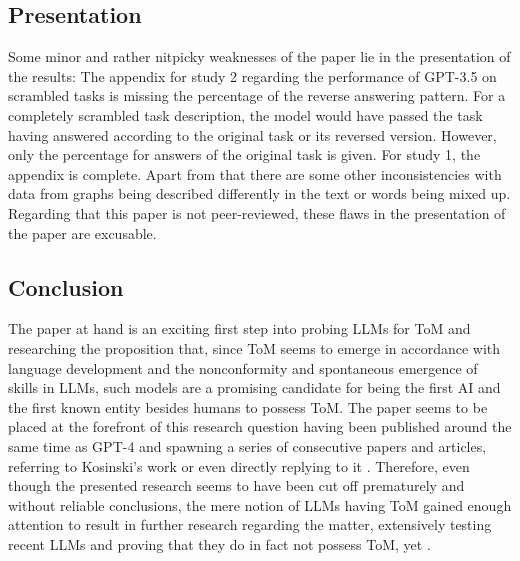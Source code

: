 \subsection{Presentation}
Some minor and rather nitpicky weaknesses of the paper lie in the presentation of the results: The appendix for study 2 regarding the performance of GPT-3.5 on scrambled tasks is missing the percentage of the reverse answering pattern. For a completely scrambled task description, the model would have passed the task having answered according to the original task or its reversed version. However, only the percentage for answers of the original task is given. For study 1, the appendix is complete. Apart from that there are some other inconsistencies with data from graphs being described differently in the text or words being mixed up.
Regarding that this paper is not peer-reviewed, these flaws in the presentation of the paper are excusable.

\subsection{Conclusion}
The paper at hand is an exciting first step into probing LLMs for ToM and researching the proposition that, since ToM seems to emerge in accordance with language development and the nonconformity and spontaneous emergence of skills in LLMs, such models are a promising candidate for being the first AI and the first known entity besides humans to possess ToM. The paper seems to be placed at the forefront of this research question having been published around the same time as GPT-4 and spawning a series of consecutive papers and articles, referring to Kosinski's work or even directly replying to it \cite{critics1,critics2,critics3}. Therefore, even though the presented research seems to have been cut off prematurely and without reliable conclusions, the mere notion of LLMs having ToM gained enough attention to result in further research regarding the matter, extensively testing recent LLMs and proving that they do in fact not possess ToM, yet \cite{critics1,critics3}.